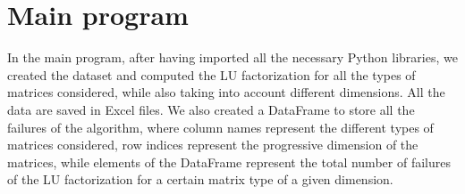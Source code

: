 \documentclass[a4paper,11pt]{report}
\begin{document}
\section{Main program}\label{subsect:Main_Program}
In the main program, after having imported all the necessary Python libraries, we created the dataset and computed the LU factorization for all the types of matrices considered, while also taking into account different dimensions. All the data are saved in Excel files. We also created a DataFrame to store all the failures of the algorithm, where column names represent the different types of matrices considered, row indices represent the progressive dimension of the matrices, while elements of the DataFrame represent the total number of failures of the LU factorization for a certain matrix type of a given dimension.
\end{document}
